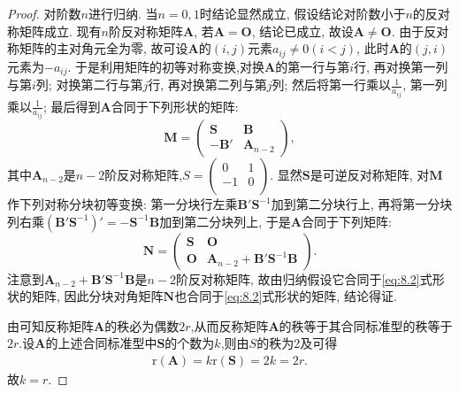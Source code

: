 \documentclass[../../main.tex]{subfiles}
\begin{document}
\begin{proof}
对阶数$n$进行归纳. 当$n = 0, 1$时结论显然成立, 假设结论对阶数小于$n$的反对称矩阵成立. 现有$n$阶反对称矩阵$\boldsymbol{A}$, 若$\boldsymbol{A}=\boldsymbol{O}$, 结论已成立, 故设$\boldsymbol{A}\neq\boldsymbol{O}$. 由于反对称矩阵的主对角元全为零, 故可设$\boldsymbol{A}$的$(i, j)$元素$a_{ij}\neq 0 (i < j)$, 此时$\boldsymbol{A}$的$(j, i)$元素为$-a_{ij}$. 于是利用矩阵的初等对称变换,对换$\boldsymbol{A}$的第一行与第$i$行, 再对换第一列与第$i$列; 对换第二行与第$j$行, 再对换第二列与第$j$列; 然后将第一行乘以$\frac{1}{a_{ij}}$, 第一列乘以$\frac{1}{a_{ij}}$; 最后得到$\boldsymbol{A}$合同于下列形状的矩阵:
\[
\boldsymbol{M}=\begin{pmatrix}
\boldsymbol{S} & \boldsymbol{B} \\
-\boldsymbol{B}' & \boldsymbol{A}_{n - 2}
\end{pmatrix},
\]
其中$\boldsymbol{A}_{n - 2}$是$n - 2$阶反对称矩阵,$S=\left( \begin{matrix}
0&		1\\
-1&		0\\
\end{matrix} \right) $. 显然$\boldsymbol{S}$是可逆反对称矩阵, 对$\boldsymbol{M}$作下列对称分块初等变换: 第一分块行左乘$\boldsymbol{B}'\boldsymbol{S}^{-1}$加到第二分块行上, 再将第一分块列右乘$(\boldsymbol{B}'\boldsymbol{S}^{-1})'=-\boldsymbol{S}^{-1}\boldsymbol{B}$加到第二分块列上, 于是$\boldsymbol{A}$合同于下列矩阵:
\[
\boldsymbol{N}=\begin{pmatrix}
\boldsymbol{S} & \boldsymbol{O} \\
\boldsymbol{O} & \boldsymbol{A}_{n - 2}+\boldsymbol{B}'\boldsymbol{S}^{-1}\boldsymbol{B}
\end{pmatrix}.
\]
注意到$\boldsymbol{A}_{n - 2}+\boldsymbol{B}'\boldsymbol{S}^{-1}\boldsymbol{B}$是$n - 2$阶反对称矩阵, 故由归纳假设它合同于\eqref{eq:8.2}式形状的矩阵, 因此分块对角矩阵$\boldsymbol{N}$也合同于\eqref{eq:8.2}式形状的矩阵, 结论得证.

由可知反称矩阵$\boldsymbol{A}$的秩必为偶数$2r$,从而反称矩阵$\boldsymbol{A}$的秩等于其合同标准型的秩等于$2r$.设$\boldsymbol{A}$的上述合同标准型中$\boldsymbol{S}$的个数为$k$,则由$S$的秩为2及可得
\begin{align*}
\mathrm{r}\left( \boldsymbol{A} \right) =k\mathrm{r}\left( \boldsymbol{S} \right) =2k=2r.
\end{align*}
故$k=r$.
\end{proof}
\end{document}
